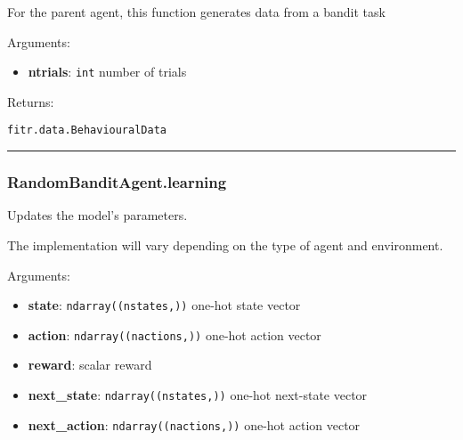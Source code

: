 \begin{Shaded}
\begin{Highlighting}[]
\end{Highlighting}
\end{Shaded}

For the parent agent, this function generates data from a bandit task

Arguments:

\begin{itemize}
\tightlist
\item
  \textbf{ntrials}: \texttt{int} number of trials
\end{itemize}

Returns:

\texttt{fitr.data.BehaviouralData}

\begin{center}\rule{0.5\linewidth}{\linethickness}\end{center}

\hypertarget{randombanditagent.learning}{%
\subsubsection{RandomBanditAgent.learning}\label{randombanditagent.learning}}

\begin{Shaded}
\begin{Highlighting}[]
\end{Highlighting}
\end{Shaded}

Updates the model's parameters.

The implementation will vary depending on the type of agent and
environment.

Arguments:

\begin{itemize}
\tightlist
\item
  \textbf{state}: \texttt{ndarray((nstates,))} one-hot state vector
\item
  \textbf{action}: \texttt{ndarray((nactions,))} one-hot action vector
\item
  \textbf{reward}: scalar reward
\item
  \textbf{next\_state}: \texttt{ndarray((nstates,))} one-hot next-state
  vector
\item
  \textbf{next\_action}: \texttt{ndarray((nactions,))} one-hot action
  vector
\end{itemize}


